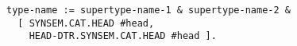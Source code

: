 \documentclass[a4paper]{article}
\begin{document}
{\small\begin{verbatim}
type-name := supertype-name-1 & supertype-name-2 &
  [ SYNSEM.CAT.HEAD #head,
    HEAD-DTR.SYNSEM.CAT.HEAD #head ].
\end{verbatim}}
\end{document}
